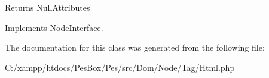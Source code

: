 \begin{DoxyReturn}{Returns}
Null\+Attributes 
\end{DoxyReturn}


Implements \mbox{\hyperlink{interface_pes_1_1_dom_1_1_node_1_1_node_interface_a4722e7722b245351681b05d35f6694f3}{Node\+Interface}}.



The documentation for this class was generated from the following file\+:\begin{DoxyCompactItemize}
\item 
C\+:/xampp/htdocs/\+Pes\+Box/\+Pes/src/\+Dom/\+Node/\+Tag/Html.\+php\end{DoxyCompactItemize}

